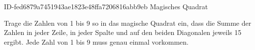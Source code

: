 \begin{exercise}
      {ID-fed6879a7451943ae1823e48ffa7206816abb9eb}
      {Magisches Quadrat}
  \ifproblem\problem\par
    \begin{minipage}{0.6\textwidth}
      Trage die Zahlen von 1 bis 9 so in das magische Quadrat ein, dass die Summe der
      Zahlen in jeder Zeile, in jeder Spalte und auf den beiden Diagonalen jeweils
      15 ergibt. Jede Zahl von 1 bis 9 muss genau einmal vorkommen.
    \end{minipage}\hfill
    \begin{minipage}{0.35\textwidth}
      \centering
    \end{minipage}
  \fi
\end{exercise}
